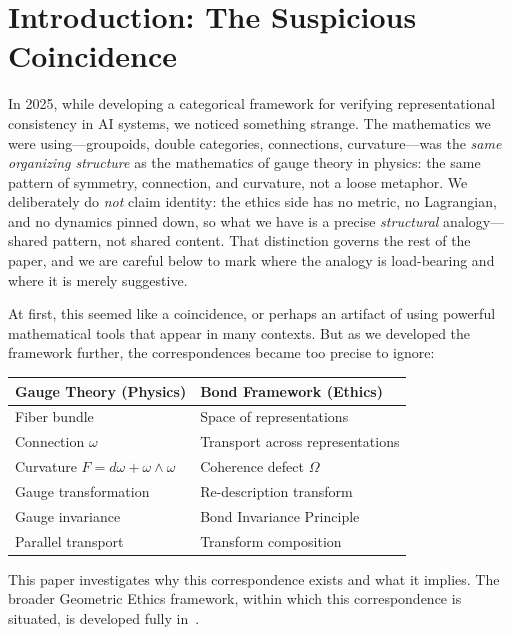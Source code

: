 \documentclass[12pt,letterpaper]{article}
\theoremstyle{definition}
\theoremstyle{remark}
\begin{document}
\newpage
\tableofcontents
\newpage

\section{Introduction: The Suspicious Coincidence}

In 2025, while developing a categorical framework for verifying representational consistency in AI systems, we noticed something strange. The mathematics we were using---groupoids, double categories, connections, curvature---was the \textit{same organizing structure} as the mathematics of gauge theory in physics: the same pattern of symmetry, connection, and curvature, not a loose metaphor. We deliberately do \emph{not} claim identity: the ethics side has no metric, no Lagrangian, and no dynamics pinned down, so what we have is a precise \emph{structural} analogy---shared pattern, not shared content. That distinction governs the rest of the paper, and we are careful below to mark where the analogy is load-bearing and where it is merely suggestive.

At first, this seemed like a coincidence, or perhaps an artifact of using powerful mathematical tools that appear in many contexts. But as we developed the framework further, the correspondences became too precise to ignore:

\begin{center}
\begin{tabular}{ll}
\toprule
\textbf{Gauge Theory (Physics)} & \textbf{Bond Framework (Ethics)} \\
\midrule
Fiber bundle & Space of representations \\
Connection $\omega$ & Transport across representations \\
Curvature $F = d\omega + \omega \wedge \omega$ & Coherence defect $\Omega$ \\
Gauge transformation & Re-description transform \\
Gauge invariance & Bond Invariance Principle \\
Parallel transport & Transform composition \\
\bottomrule
\end{tabular}
\end{center}

This paper investigates why this correspondence exists and what it implies. The broader Geometric Ethics framework, within which this correspondence is situated, is developed fully in~\cite{bond2026ge}.
\end{document}
